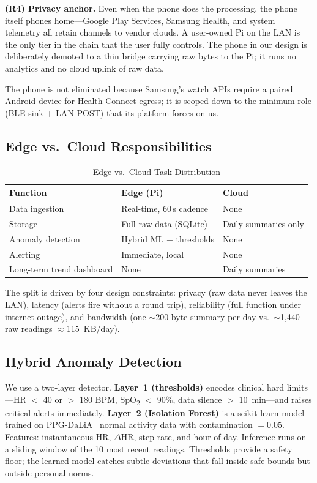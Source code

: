 \documentclass[conference]{IEEEtran}
\begin{document}
\textbf{(R4) Privacy anchor.} Even when the phone does the processing, the phone itself phones home---Google Play Services, Samsung Health, and system telemetry all retain channels to vendor clouds. A user-owned Pi on the LAN is the only tier in the chain that the user fully controls. The phone in our design is deliberately demoted to a thin bridge carrying raw bytes to the Pi; it runs no analytics and no cloud uplink of raw data.

The phone is not eliminated because Samsung's watch APIs require a paired Android device for Health Connect egress; it is scoped down to the minimum role (BLE sink + LAN POST) that its platform forces on us.

\subsection{Edge vs.\ Cloud Responsibilities}

\begin{table}[htbp]
\caption{Edge vs.\ Cloud Task Distribution}
\label{tab:edge_cloud}
\centering
\footnotesize
\begin{tabularx}{\columnwidth}{lXX}
\toprule
\textbf{Function} & \textbf{Edge (Pi)} & \textbf{Cloud} \\
\midrule
Data ingestion & Real-time, 60\,s cadence & None \\
Storage & Full raw data (SQLite) & Daily summaries only \\
Anomaly detection & Hybrid ML + thresholds & None \\
Alerting & Immediate, local & None \\
Long-term trend dashboard & None & Daily summaries \\
\bottomrule
\end{tabularx}
\end{table}

The split is driven by four design constraints: privacy (raw data never leaves the LAN), latency (alerts fire without a round trip), reliability (full function under internet outage), and bandwidth (one $\sim$200-byte summary per day vs.\ $\sim$1{,}440 raw readings $\approx$115~KB/day).

\subsection{Hybrid Anomaly Detection}

We use a two-layer detector. \textbf{Layer~1 (thresholds)} encodes clinical hard limits---HR $<$ 40 or $>$ 180 BPM, SpO\textsubscript{2} $<$ 90\%, data silence $>$ 10~min---and raises critical alerts immediately. \textbf{Layer~2 (Isolation Forest)} is a scikit-learn model trained on PPG-DaLiA~\cite{ppg_dalia} normal activity data with contamination $= 0.05$. Features: instantaneous HR, $\Delta$HR, step rate, and hour-of-day. Inference runs on a sliding window of the 10 most recent readings. Thresholds provide a safety floor; the learned model catches subtle deviations that fall inside safe bounds but outside personal norms.
\end{document}
